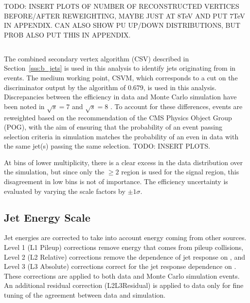 TODO: INSERT PLOTS OF NUMBER OF RECONSTRUCTED VERTICES BEFORE/AFTER REWEIGHTING, MAYBE JUST AT 8TeV AND PUT
7TeV IN APPENDIX. CAN ALSO SHOW PU UP/DOWN DISTRIBUTIONS, BUT PROB ALSO PUT THIS IN APPENDIX.

\subsection{\btagging}
\label{ss:b_tagging}
The combined secondary vertex \btagging algorithm (CSV) described in Section~\ref{sss:b_jets} is used in this
analysis to identify jets originating from \bquarks in \ttbar events. The medium working point, CSVM, which
corresponds to a cut on the discriminator output by the algorithm of 0.679, is used in this analysis.
Discrepancies between the \btagging efficiency in data and Monte Carlo simulation have been noted in
$\sqrt{s}=7$ \cite{CMS-PAS-BTV-11-004} and $\sqrt{s}=8$ \cite{CMS-DP-2013-005}. To account for these
differences, events are reweighted based on the recommendation of the CMS \btagging Physics Object Group
(POG), with the aim of ensuring that the probability of an event passing selection criteria in simulation
matches the probability of an even in data with the same jet(s) passing the same selection. TODO: INSERT
PLOTS.

At bins of lower multiplicity, there is a clear excess in the data distribution over the simulation, but since
only the $\geq2$ \btags region is used for the signal region, this disagreement in low bins is not of
importance.  %
The \btagging efficiency uncertainty is evaluated by varying the scale factors by $\pm1\sigma$.

\subsection{Jet Energy Scale}
\label{sss:jet_energy_scale}
Jet energies are corrected to take into account energy coming from other sources. Level 1 (L1 Pileup)
corrections remove energy that comes from pileup collisions, Level 2 (L2 Relative) corrections remove the
dependence of jet response on \eta, and Level 3 (L3 Absolute) corrections correct for the jet response
dependence on \pt \cite{Chatrchyan:2011ds}. These corrections are applied to both data and Monte Carlo
simulation events. An additional residual correction (L2L3Residual) is applied to data only for fine tuning of the agreement between data and
simulation.

